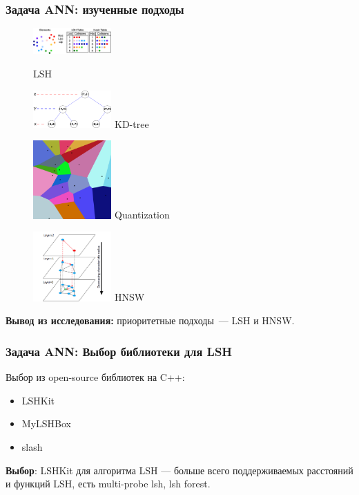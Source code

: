 \documentclass{beamer}
\begin{document}
\begin{frame}


\frametitle{Задача ANN: изученные подходы}
\begin{center}

\begin{figure}
\begin{minipage}{4cm}
\centering
\includegraphics[width=3cm]{img/lsh_hashtable.png}

LSH
\end{minipage}
\begin{minipage}{4cm}
\centering
\includegraphics[width=3cm]{img/kdtree-tree.png}
KD-tree
\end{minipage}
\end{figure}
\begin{figure}
\begin{minipage}{4cm}
\centering
\includegraphics[width=3cm]{img/voronoi.png}
Quantization
\end{minipage}
\begin{minipage}{4cm}
\centering
\includegraphics[width=3cm]{img/hnsw_graph.png}
HNSW
\end{minipage}
\end{figure}

\textbf{Вывод из исследования:} приоритетные подходы~--- LSH и HNSW.

\end{center}

\end{frame}

\begin{frame}

\frametitle{Задача ANN: Выбор библиотеки для LSH}

Выбор из open-source библиотек на C++:
\begin{itemize}
\item LSHKit
\item MyLSHBox
\item slash
\end{itemize}

\textbf{Выбор}: LSHKit для алгоритма LSH --- больше всего поддерживаемых расстояний и функций LSH, есть multi-probe lsh, lsh forest.

\end{frame}
\end{document}
